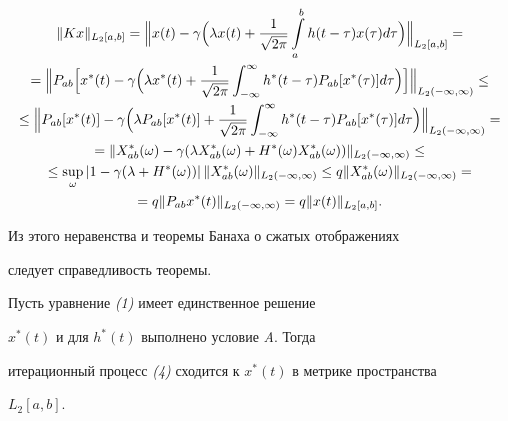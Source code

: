 \begin{gather*}


\|Kx\|_{L_2[a,b]}=\Bigl\|x(t)-\gamma\Bigl(\lambda


x(t)+\frac{1}{\sqrt {2\pi}}\int\limits_a^b h(t-\tau)


x(\tau) d\tau\Bigr)\Bigr\|_{L_2[a,b]}= \\


%


=\Bigl\|P_{ab}\Bigl[x^*(t)-\gamma\Bigl(\lambda x^*(t)+


\frac{1}{\sqrt {2\pi}}\int_{-\infty}^\infty


h^*(t-\tau) P_{ab}[x^*(\tau)]d\tau\Bigr)\Bigr]


\Bigr\|_{L_2(-\infty,\infty)} \le \\


%


\le \Bigl\|P_{ab} [x^*(t)]-\gamma\Bigl(\lambda


P_{ab} [x^*(t)]+\frac{1}{\sqrt{ 2\pi}}\int_{-\infty}


^\infty h^*(t-\tau) P_{ab} [x^*(\tau)]


d\tau \Bigr)\Bigr\|_{L_2(-\infty,\infty)} = \\


%


=\|X^*_{ab}(\omega)-\gamma(\lambda X^*_


{ab}(\omega)+H^*(\omega) X^*_{ab}(\omega))


\|_{L_2(-\infty,\infty)} \le \\


%


\le \sup_\omega |1-\gamma(\lambda + H^*(\omega))|\,


\|X^*_{ab}(\omega)\|_{L_2(-\infty,\infty)}


\le q\|X^*_{ab}(\omega)\|_{L_2(-\infty,\infty)}= \\


%


=q \|P_{ab} x^*(t)\|_{L_2(-\infty,\infty)}=q\|x(t)\|_{L_2[a,b]}.


\end{gather*}





Из этого неравенства и теоремы Банаха о сжатых отображениях


следует справедливость теоремы.





\begin{thm} Пусть уравнение {\em (1)} имеет единственное решение


$x^*(t)$ и для $h^*(t)$ выполнено условие {\em A}. Тогда


итерационный процесс {\em (4)} сходится к $x^*(t)$ в метрике пространства


$L_2[a,b]$.


\end{thm}





